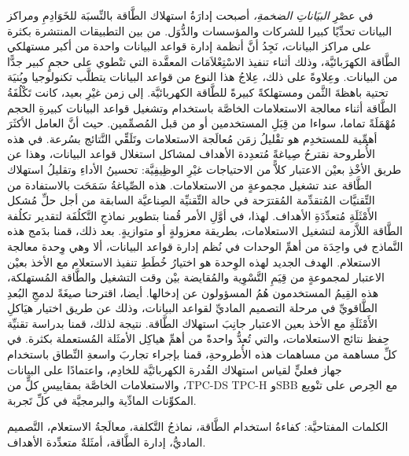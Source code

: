 {\fontsize{14pt}{16pt}\selectfont في عصْرِ  \textit{البيَاناتِ الضخمةِ،} أصبحت إدارَةُ استهلاك الطَّاقة بالنِّسبَة للخَوَادِمِ ومراكز البيانات تحدِّيًا كبيرا للشركات والمؤسسات والدُّوَل. من بين التطبيقات المنتشرة بكثرة على مراكز البيانات، نَجِدُ أنَّ أنظمة إدارة قواعد البيانات واحدة من أكبر مستهلكي الطَّاقة  الكهرَبائيَّة، وذلك أثناء تنفيذ الاسْتِعْلاَمَات المعقَّدة التي تنْطوي على حجمٍ كبير جدًّا من البيانات.
وعِلاوةً على ذلك، عِلاجُ هذا النوع من قواعد البيانات يتطلَّب تكنولوجيا وبُنيَة تحتية باهظةَ الثَّمن ومستهلكةً كبيرةً للطَّاقة الكهربائيَّة. إلى زمن غيْرِ بعيد، كانت تَكْلُفَةُ الطَّاقة أثناء معالجة الاستعلامات الخاصَّة باستخدام وتشغيل قواعد البيانات كبيرةِ الحجم مُهْمَلَةً تماما، سواءا من قِبَلِ المستخدمين أو من قبل المُصمِّمين. حيث أنَّ العامل الأكثَرَ أهمِّية للمستخدِم هو تقْليلُ زمَن مُعالَجة الاستعلامات وتَلَقِّي النَّتائج بسُرعة. في هذه الأُطروحة نقترحُ صِياغةً مُتعدِدة الأهداف لمشاكل استغلال قواعد البيانات، وهذا عن طريق الأخْذِ بعيْن الاعتبار كلاًّ من الاحتياجات غيْرِ الوظِيفِيَّة: تحسينُ الأداءِ وتقليلُ استهلاك الطَّاقة عند تشغيل مجموعةٍ من الاستعلامات. هذه الصِّياغةُ سَمَحَت بالاستفادة من التِّقنيَّات المُتقدِّمة المُقترَحة في حالة التِّقنيِّة الصِناعيَّة السابقة من أجل حلِّ مُشكل الأَمْثَلَةِ مُتعدِّدَةِ الأهداف. لهذا، في أوَّلِ الأمر قُمنا بتطوير نماذجِ التَّكلُفَة لتقدير تكلُفة الطَّاقة اللاَّزمة لتشغيل الاستعلامات، بطريقة معزولةٍ أو متوازيةٍ. بعد ذلك، قمنا بدَمج هذه النَّماذج في واحِدَة من أهمِّ الوحدات في نُظم إدارة قواعد البيانات، ألا وهي وِحدة معالجة الاستعلام. الهدف الجديد لهذه الوِحدة هو اختيارُ خُطَطِ تنفيذ الاستعلام مع الأخذ بعيْن الاعتبار لمجموعةٍ من قِيَمِ التَّسْوِية والمُقايضة بيْن وقت التشغيل والطَّاقة المُستهلكة، هذه القِيمُ المستخدمون هُمُ المسؤولون عن إدخالها. أيضا، اقترحنا صيغَةً لدمجِ البُعدِ الطَّاقويِّ في مرحلة التصميم الماديِّ لقواعد البيانات، وذلك عن طريق اختيار هيَاكلِ الأَمْثَلَةِ مع الأخذ بعين الاعتبار جانِبَ استهلاك الطَّاقة. نتيجة لذلك، قمنا بدراسة تقنيِّة حِفظ نتائج الاستعلامات، والتي تُعدُّ واحدةً من أهمِّ هياكِل الأمثَلة المُستعملة بكثرة. في كلِّ مساهمة من مساهمات هذه الأُطروحةِ، قمنا بإجراء تجاربَ واسعةِ النِّطاق باستخدام جهاز فعليٍّ لقياس استهلاك القُدرة الكهربائيَّة للخادِم، واعتمادًا على البيانات والاستعلامات الخاصَّة بمقاييسِ كلٍّ من ،TPC-DS TPC-H وSBB مع الحِرص على تنْويع المكوِّنات المادِّية والبرمجيَّة في كلِّ تَجربة.

\par\bigskip\noindent
{الكلمات المفتاحيَّة:}  كفاءةُ استخدام الطَّاقة، نماذجُ التَّكلفة، معالَجةُ الاستعلام، التَّصميم الماديُّ، إدارة الطَّاقة، أمثَلةٌ متعدِّدة الأهداف.\par}

